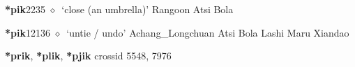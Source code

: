   \begin{list}{}{\leftmargin=1.5em \itemindent=-1.5em}
  \item {\footnotesize \textbf{*pik}}{\tiny 2235}
         $\diamond$~`close (an umbrella)'
         Rangoon 
\hspace{1ex}
         Atsi 
\hspace{1ex}
         Bola 
  \item {\footnotesize \textbf{*pik}}{\tiny 12136}
\hspace{1ex}
         $\diamond$~`untie / undo'
         Achang\_Longchuan 
\hspace{1ex}
         Atsi 
\hspace{1ex}
         Bola 
\hspace{1ex}
         Lashi 
\hspace{1ex}
         Maru 
\hspace{1ex}
         Xiandao 
  \end{list}
\item
\textbf{*prik}, \textbf{*plik}, \textbf{*pjik}
  {\tiny crossid 5548, 7976}
